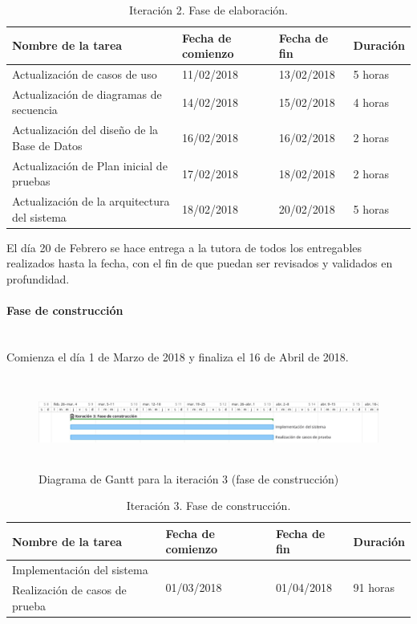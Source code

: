 \documentclass[twoside]{report}
\begin{document}
\begin{table}[H]
\centering
\begin{tabular}{|l|l|l|l|}
\hline
Nombre de la tarea                           & Fecha de comienzo & Fecha de fin & Duración \\ \hline
Actualización de casos de uso                & 11/02/2018        & 13/02/2018   & 5 horas   \\ \hline
Actualización de diagramas de secuencia      & 14/02/2018        & 15/02/2018   & 4 horas   \\ \hline
Actualización del diseño de la Base de Datos & 16/02/2018        & 16/02/2018   & 2 horas   \\ \hline
Actualización de Plan inicial de pruebas     & 17/02/2018        & 18/02/2018   & 2 horas   \\ \hline
Actualización de la arquitectura del sistema & 18/02/2018        & 20/02/2018   & 5 horas   \\ \hline
\end{tabular}
\caption{Iteración 2. Fase de elaboración.}
\end{table}

El día 20 de Febrero se hace entrega a la tutora de todos los entregables realizados hasta la fecha, con el fin de que puedan ser revisados y validados en profundidad.


\paragraph{Fase de construcción}\mbox{}\\

Comienza el día 1 de Marzo de 2018 y finaliza el 16 de Abril de 2018.

\begin{figure}[h]
\begin{center}
\includegraphics[height=3cm,width=\textwidth]{images/gantt/ite3}
\caption{Diagrama de Gantt para la iteración 3 (fase de construcción)}
\end{center}
\end{figure}


\begin{table}[H]
\centering
\begin{tabular}{|l|l|l|l|}
\hline
Nombre de la tarea             & Fecha de comienzo & Fecha de fin & Duración \\ \hline
Implementación del sistema & \multirow{2}{*}{01/03/2018}  & \multirow{2}{*}{01/04/2018}   & \multirow{2}{*}{91 horas}  \\
Realización de casos de prueba & & & \\
\hline
\end{tabular}
\caption{Iteración 3. Fase de construcción.}
\end{table}
\end{document}
